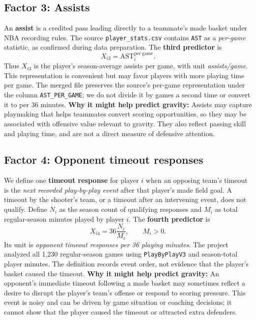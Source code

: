 \documentclass[11pt]{article}
\begin{document}
\subsection{Factor 3: Assists}
An \textbf{assist} is a credited pass leading directly to a teammate's made
basket under NBA recording rules. The source
\texttt{player\_stats.csv} contains \texttt{AST} as a \emph{per-game}
statistic, as confirmed during data preparation. The \textbf{third
predictor} is
\begin{equation}
 \boxed{X_{i3}=\mathrm{AST}^{\mathrm{per\ game}}_i.}
 \label{eq:assists}
\end{equation}
Thus $X_{i3}$ is the player's season-average assists per game, with unit
\emph{assists/game}. This representation is convenient but may favor
players with more playing time per game. The merged file preserves the
source's per-game representation under the column \texttt{AST\_PER\_GAME};
we do not divide it by games a second time or convert it to per 36 minutes.
\textbf{Why it might help predict gravity:} Assists may capture playmaking
that helps teammates convert scoring opportunities, so they may be
associated with offensive value relevant to gravity. They also reflect
passing skill and playing time, and are not a direct measure of defensive
attention.

\subsection{Factor 4: Opponent timeout responses}
We define one \textbf{timeout response} for player $i$ when an opposing
team's timeout is the \emph{next recorded play-by-play event} after that
player's made field goal. A timeout by the shooter's team, or a timeout
after an intervening event, does not qualify. Define $N_i$ as the season
count of qualifying responses and $M_i$ as total regular-season minutes
played by player $i$. The \textbf{fourth predictor} is
\begin{equation}
 \boxed{X_{i4}=36\frac{N_i}{M_i}},\qquad M_i>0.
 \label{eq:timeouts}
\end{equation}
Its unit is \emph{opponent timeout responses per 36 playing minutes}.
The project analyzed all 1,230 regular-season games using
\texttt{PlayByPlayV3} and season-total player minutes. The definition
records event order, not evidence that the player's basket caused the
timeout.
\textbf{Why it might help predict gravity:} An opponent's immediate
timeout following a made basket may sometimes reflect a desire to disrupt
the player's team's offense or respond to scoring pressure. This event is
noisy and can be driven by game situation or coaching decisions; it cannot
show that the player caused the timeout or attracted extra defenders.
\end{document}
